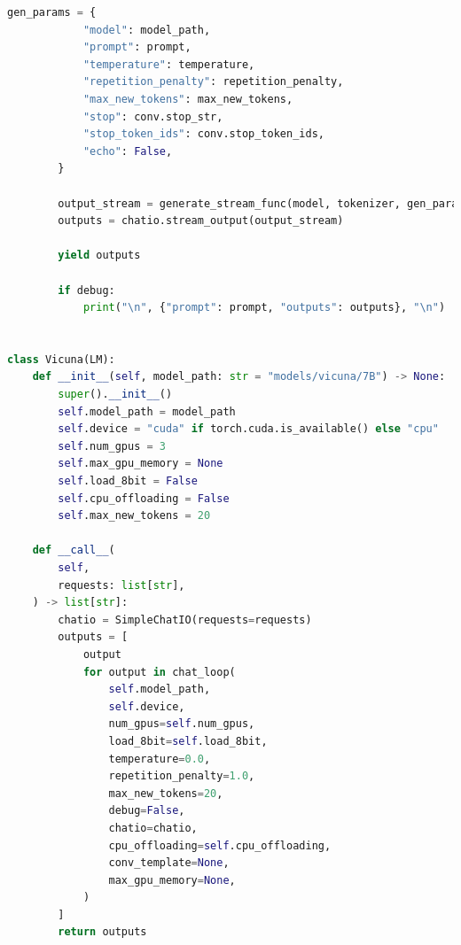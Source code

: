 \documentclass[a4paper,12pt]{article}
\begin{document}
\begin{lstlisting}[language=Python]
        gen_params = {
            "model": model_path,
            "prompt": prompt,
            "temperature": temperature,
            "repetition_penalty": repetition_penalty,
            "max_new_tokens": max_new_tokens,
            "stop": conv.stop_str,
            "stop_token_ids": conv.stop_token_ids,
            "echo": False,
        }

        output_stream = generate_stream_func(model, tokenizer, gen_params, device)
        outputs = chatio.stream_output(output_stream)

        yield outputs

        if debug:
            print("\n", {"prompt": prompt, "outputs": outputs}, "\n")


class Vicuna(LM):
    def __init__(self, model_path: str = "models/vicuna/7B") -> None:
        super().__init__()
        self.model_path = model_path
        self.device = "cuda" if torch.cuda.is_available() else "cpu"
        self.num_gpus = 3
        self.max_gpu_memory = None
        self.load_8bit = False
        self.cpu_offloading = False
        self.max_new_tokens = 20

    def __call__(
        self,
        requests: list[str],
    ) -> list[str]:
        chatio = SimpleChatIO(requests=requests)
        outputs = [
            output
            for output in chat_loop(
                self.model_path,
                self.device,
                num_gpus=self.num_gpus,
                load_8bit=self.load_8bit,
                temperature=0.0,
                repetition_penalty=1.0,
                max_new_tokens=20,
                debug=False,
                chatio=chatio,
                cpu_offloading=self.cpu_offloading,
                conv_template=None,
                max_gpu_memory=None,
            )
        ]
        return outputs
\end{lstlisting}
\end{document}

